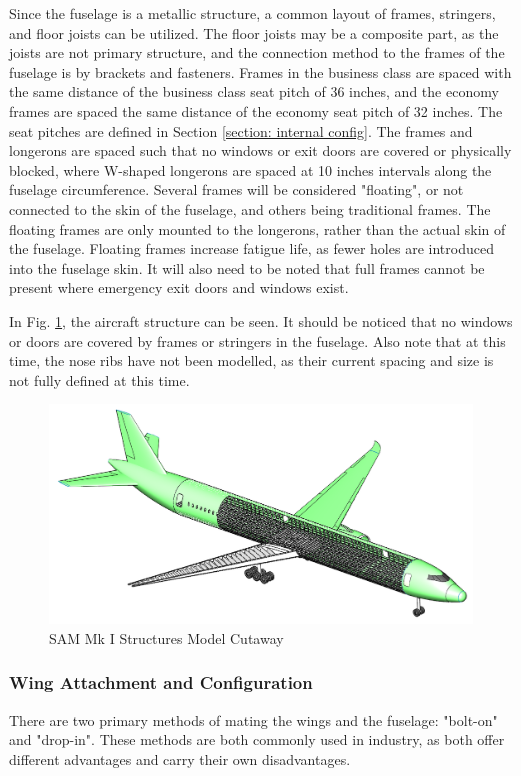 Since the fuselage is a metallic structure, a common layout of frames, stringers, and floor joists can be utilized. The floor joists may be a composite part, as the joists are not primary structure, and the connection method to the frames of the fuselage is by brackets and fasteners. Frames in the business class are spaced with the same distance of the business class seat pitch of 36 inches, and the economy frames are spaced the same distance of the economy seat pitch of 32 inches. The seat pitches are defined in Section \ref{section: internal config}. The frames and longerons are spaced such that no windows or exit doors are covered or physically blocked, where W-shaped longerons are spaced at 10 inches intervals along the fuselage circumference. Several frames will be considered "floating", or not connected to the skin of the fuselage, and others being traditional frames. The floating frames are only mounted to the longerons, rather than the actual skin of the fuselage. Floating frames increase fatigue life, as fewer holes are introduced into the fuselage skin. It will also need to be noted that full frames cannot be present where emergency exit doors and windows exist.

In Fig. \ref{fig:structure_cutaway}, the aircraft structure can be seen. It should be noticed that no windows or doors are covered by frames or stringers in the fuselage. Also note that at this time, the nose ribs have not been modelled, as their current spacing and size is not fully defined at this time.

\begin{figure}[!h]
    \centering
    \includegraphics[width=\linewidth]{Photos/structuresandloads/Updated Structures Cutaway.PNG}
    \caption{SAM Mk I Structures Model Cutaway}
    \label{fig:structure_cutaway}
\end{figure}

\subsubsection{Wing Attachment and Configuration}
There are two primary methods of mating the wings and the fuselage: "bolt-on" and "drop-in". These methods are both commonly used in industry, as both offer different advantages and carry their own disadvantages. 

